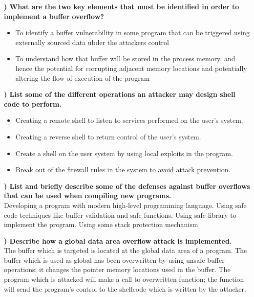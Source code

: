\documentclass{report}
\newcommand{\mysubsection}[2]{\textbf{\romannumeral #1) #2}}
\begin{document}
\noindent\mysubsection{10}{What are the two key elements that must be identified in order to implement a buffer overflow?}
\begin{itemize}
  \item{To identify a buffer vulnerability in some program that can be
    triggered using externally sourced data ubder the attackers control} 
  \item{To understand how that buffer will be stored in the process memory, and
    hence the potential for corrupting adjacent memory locations and
  potentially altering the flow of execution of the program} 
\end{itemize}

\noindent\mysubsection{11}{List some of the different operations an attacker may design shell code to perform.}
\begin{itemize}
  \item{Creating a remote shell to listen to services performed on the user's system. } 
  \item{Creating a reverse shell to return control of the user's system. } 
  \item{Create a shell on the user system by using local exploits in the program. } 
  \item{Break out of the firewall rules in the system to avoid attack prevention.} 
\end{itemize}

\noindent\mysubsection{12}{List and briefly describe some of the defenses against buffer overflows that can be used when compiling new programs.}
\\Developing a program with modern high-level programming language. 
Using safe code techniques like buffer validation and safe functions. 
Using safe library to implement the program. 
Using some stack protection mechanism

\noindent\mysubsection{13}{Describe how a global data area overflow attack is implemented.}
\\The buffer which is targeted is located at the global data area of a program. 
The buffer which is used as global has been overwritten by using unsafe buffer operations; 
it changes the pointer memory locations used in the buffer. 
The program which is attacked will make a call to overwritten function; 
the function will send the program's control to the shellcode which is written by the attacker.
\end{document}
